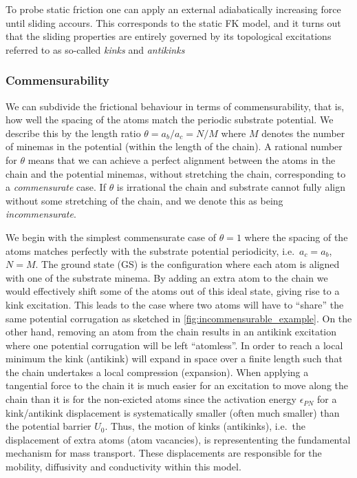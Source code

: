 To probe static friction one can apply an external adiabatically increasing force until sliding accours. This corresponds to the static \acrshort{FK} model, and it turns out that the sliding properties are entirely governed by its topological excitations referred to as so-called \textit{kinks} and \textit{antikinks}

\subsubsection{Commensurability} We can subdivide the frictional behaviour in terms of commensurability, that is, how well the spacing of the atoms match the periodic substrate potential. We describe this by the length ratio $\theta = a_b / a_c = N / M$ where $M$ denotes the number of minemas in the potential (within the length of the chain). A rational number for $\theta$ means that we can achieve a perfect alignment between the atoms in the chain and the potential minemas, without stretching the chain, corresponding to a \textit{commensurate} case. If $\theta$ is irrational the chain and substrate cannot fully align without some stretching of the chain, and we denote this as being \textit{incommensurate}.

We begin with the simplest commensurate case of $\theta = 1$ where the spacing
of the atoms matches perfectly with the substrate potential periodicity, i.e.\
$a_c = a_b$, $N = M$. The ground state (\acrshort{GS}) is the configuration where each atom
is aligned with one of the substrate minema. By adding an extra atom to the chain we would effectively shift some of the atoms out of this ideal state, giving rise to a kink excitation. This leads to the case where two atoms will have to ``share'' the same potential corrugation as sketched in \cref{fig:incommensurable_example}.  On the
other hand, removing an atom from the chain results in an antikink excitation
where one potential corrugation will be left ``atomless''. In order to reach a
local minimum the kink (antikink) will expand in space over a finite length such
that the chain undertakes a local compression (expansion). When applying a
tangential force to the chain it is much easier for an excitation to move along
the chain than it is for the non-exicted atoms since the activation energy
$\epsilon_{PN}$ for a kink/antikink displacement is systematically smaller
(often much smaller) than the potential barrier $U_0$. Thus, the motion of kinks
(antikinks), i.e.\ the displacement of extra atoms (atom vacancies), is
represententing the fundamental mechanism for mass transport. These
displacements are responsible for the mobility, diffusivity and conductivity
within this model. 

